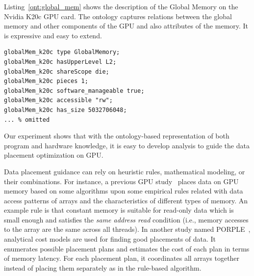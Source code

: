 Listing~\ref{ont:global_mem} shows the description of the
\textsf{Global Memory} on the Nvidia K20c GPU card.  The ontology
captures relations between the global memory and other components of
the GPU and also attributes of the memory.  It is expressive and easy
to extend. 
\begin{lstlisting}[xleftmargin=.05\columnwidth, 
xrightmargin=.05\columnwidth, float=h,
caption=Ontology of Tesla K20c global memory,label=ont:global_mem]
globalMem_k20c type GlobalMemory;
globalMem_k20c hasUpperLevel L2;
globalMem_k20c shareScope die;
globalMem_k20c pieces 1;
globalMem_k20c software_manageable true;
globalMem_k20c accessible "rw";
globalMem_k20c has_size 5032706048;
... % omitted
\end{lstlisting}

\vspace*{.1in}
Our experiment shows that with the ontology-based representation of
both program and hardware knowledge, it is easy to develop analysis to
guide the data placement optimization on GPU. 

Data placement guidance can rely on heuristic rules, mathematical
modeling, or their combinations.  For instance, a previous GPU
study~\cite{Jang2011} places data on GPU memory based on some
algorithms upon some empirical rules related with data access patterns
of arrays and the characteristics of different types of memory.  An
example rule is that constant memory is suitable for read-only data
which is small enough and satisfies the \emph{same address read}
condition (i.e., memory accesses to the array are the same across all
threads).  In another study named PORPLE~\cite{Chen2014}, analytical
cost models are used for finding good placements of data.  It
enumerates possible placement plans and estimates the cost of each
plan in terms of memory latency.  For each placement plan, it
coordinates all arrays together instead of placing them separately as
in the rule-based algorithm.

